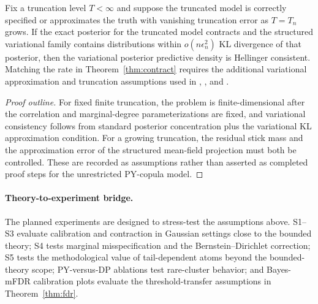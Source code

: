\begin{theorem}
\label{thm:vi}
Fix a truncation level $T<\infty$ and suppose the truncated model is correctly specified or approximates the truth with vanishing truncation error as $T=T_n$ grows. If the exact posterior for the truncated model contracts and the structured variational family contains distributions within $o(n\epsilon_n^2)$ KL divergence of that posterior, then the variational posterior predictive density is Hellinger consistent. Matching the rate in Theorem~\ref{thm:contract} requires the additional variational approximation and truncation assumptions used in \citet{AlquierRidgway2020}, \citet{YangPatiBhattacharya2020}, and \citet{WangBlei2019}.
\end{theorem}

\begin{proof}[Proof outline]
For fixed finite truncation, the problem is finite-dimensional after the correlation and marginal-degree parameterizations are fixed, and variational consistency follows from standard posterior concentration plus the variational KL approximation condition. For a growing truncation, the residual stick mass and the approximation error of the structured mean-field projection must both be controlled. These are recorded as assumptions rather than asserted as completed proof steps for the unrestricted PY-copula model.
\end{proof}

\paragraph{Theory-to-experiment bridge.}
The planned experiments are designed to stress-test the assumptions above. S1--S3 evaluate calibration and contraction in Gaussian settings close to the bounded theory; S4 tests marginal misspecification and the Bernstein--Dirichlet correction; S5 tests the methodological value of tail-dependent atoms beyond the bounded-theory scope; PY-versus-DP ablations test rare-cluster behavior; and Bayes-mFDR calibration plots evaluate the threshold-transfer assumptions in Theorem~\ref{thm:fdr}.

